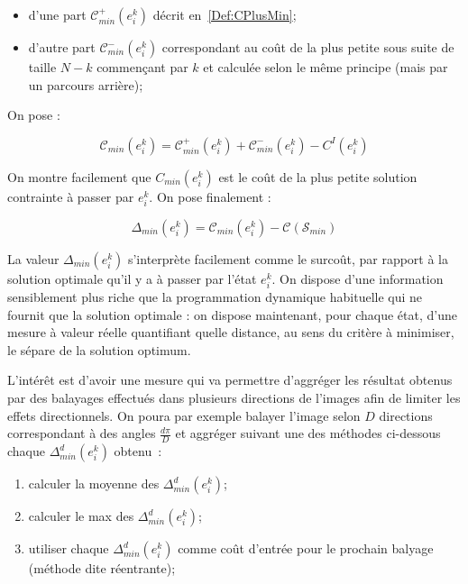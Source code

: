 {\begin{itemize}
   \item d'une part $ \mathcal C^+_{min} (e^k_i)$ d\'ecrit
    en~\ref{Def:CPlusMin};

   \item d'autre part $ \mathcal C^-_{min} (e^k_i)$ correspondant
   au co\^ut de la plus petite sous suite de
   taille $N-k$  commen\c{c}ant par $k$  et calcul\'ee selon
   le m\^eme principe  (mais par un parcours arri\`ere);

\end{itemize}

On pose :

\begin{equation}
  \mathcal C_{min}(e^k_i) = \mathcal C^+_{min} (e^k_i) + \mathcal C^-_{min} (e^k_i) - C^I(e^k_i)
\end{equation}

On montre facilement que $C_{min}(e^k_i)$ est le co\^ut de la plus
petite solution contrainte \`a passer par $e^k_i$.
On pose finalement :

\begin{equation}
    \Delta_{min}(e^k_i) = \mathcal C_{min}(e^k_i) -  \mathcal C ( \mathcal S_{min})
\end{equation}

La valeur $\Delta_{min}(e^k_i)$ s'interpr\`ete facilement comme
le surco\^ut, par rapport \`a la solution optimale qu'il y a \`a passer
par l'\'etat $e^k_i$. On dispose d'une information sensiblement
plus riche que la programmation dynamique  habituelle qui ne fournit
que la solution optimale : on dispose maintenant, pour chaque \'etat,
d'une mesure \`a valeur r\'eelle quantifiant  quelle distance, au sens
du crit\`ere \`a minimiser, le s\'epare de la solution optimum.


L'int\'er\^et est d'avoir une mesure qui va permettre d'aggr\'eger les
r\'esultat obtenus par des balayages effectu\'es dans plusieurs
directions de l'images afin de limiter les effets directionnels.
On poura par exemple balayer l'image selon $D$ directions
correspondant \`a des angles $\frac{d\pi}{D}$ et aggr\'eger
suivant une des m\'ethodes ci-dessous chaque $\Delta^d_{min}(e^k_i)$ obtenu~:

\begin{enumerate}
   \item calculer la moyenne des $\Delta^d_{min}(e^k_i)$;
   \item calculer le max des $\Delta^d_{min}(e^k_i)$;
   \item utiliser chaque $\Delta^d_{min}(e^k_i)$ comme co\^ut d'entr\'ee
         pour le prochain balyage (m\'ethode dite r\'eentrante);
\end{enumerate}




}
